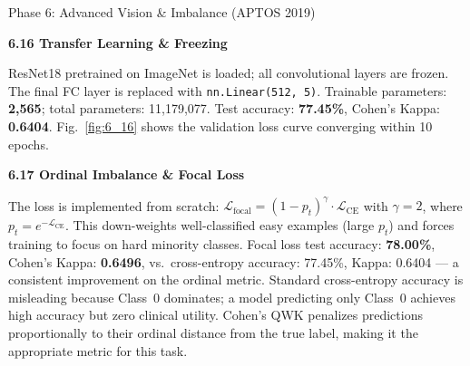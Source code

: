 \documentclass[11pt,a4paper,onecolumn]{exam}
\newcommand{\questionheader}[1]{%
  \begin{tcolorbox}[
    enhanced,
    colback=black,
    coltext=white,
    boxrule=0pt,
    fontupper=\Large\bfseries,
    arc=4mm
  ]
  #1
  \end{tcolorbox}%
}
\begin{document}
\questionheader{Phase 6: Advanced Vision \& Imbalance (APTOS 2019)}

\textbf{6.16 Transfer Learning \& Freezing}
\begin{solution}
ResNet18 pretrained on ImageNet is loaded; all convolutional layers are frozen. The final FC layer is replaced with \verb|nn.Linear(512, 5)|. Trainable parameters: \textbf{2,565}; total parameters: 11,179,077. Test accuracy: \textbf{77.45\%}, Cohen's Kappa: \textbf{0.6404}. Fig.~\ref{fig:6_16} shows the validation loss curve converging within 10 epochs.
\end{solution}

\textbf{6.17 Ordinal Imbalance \& Focal Loss}
\begin{solution}
The loss is implemented from scratch: $\mathcal{L}_{\text{focal}} = (1-p_t)^\gamma \cdot \mathcal{L}_{\text{CE}}$ with $\gamma=2$, where $p_t = e^{-\mathcal{L}_{\text{CE}}}$. This down-weights well-classified easy examples (large $p_t$) and forces training to focus on hard minority classes. Focal loss test accuracy: \textbf{78.00\%}, Cohen's Kappa: \textbf{0.6496}, vs.\ cross-entropy accuracy: 77.45\%, Kappa: 0.6404 — a consistent improvement on the ordinal metric. Standard cross-entropy accuracy is misleading because Class~0 dominates; a model predicting only Class~0 achieves high accuracy but zero clinical utility. Cohen's QWK penalizes predictions proportionally to their ordinal distance from the true label, making it the appropriate metric for this task.
\end{solution}
\end{document}
